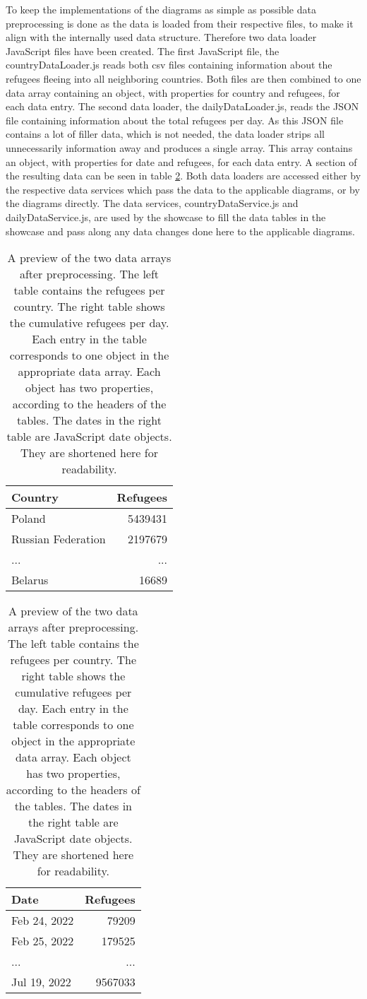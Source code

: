 To keep the implementations of the diagrams as simple as possible data preprocessing is done as the data is loaded from their respective files, to make it align with the internally used data structure. Therefore two data loader JavaScript files have been created. The first JavaScript file, the countryDataLoader.js reads both csv files containing information about the refugees fleeing into all neighboring countries. Both files are then combined to one data array containing an object, with properties for country and refugees, for each data entry. The second data loader, the dailyDataLoader.js, reads the JSON file containing information about the total refugees per day. As this JSON file contains a lot of filler data, which is not needed, the data loader strips all unnecessarily information away and produces a single array. This array contains an object, with properties for date and refugees, for each data entry. A section of the resulting data can be seen in table \ref{tab:data}. Both data loaders are accessed either by the respective data services which pass the data to the applicable diagrams, or by the diagrams directly. The data services, countryDataService.js and dailyDataService.js, are used by the showcase to fill the data tables in the showcase and pass along any data changes done here to the applicable diagrams.

\begin{table}[ht]
    \centering
    \begin{tabular}{l|r}
        Country & Refugees \\
        \hline \hline
        Poland & 5439431 \\
        Russian Federation & 2197679 \\
        ... & ... \\
        Belarus & 16689 \\
    \end{tabular}
    \quad
    \begin{tabular}{l|r}
        Date & Refugees \\
        \hline \hline
        Feb 24, 2022 & 79209 \\
        Feb 25, 2022 & 179525 \\
        ... & ... \\
        Jul 19, 2022 & 9567033 \\
    \end{tabular}
    \captionsetup{width=0.9\textwidth}
    \caption{A preview of the two data arrays after preprocessing. The left table contains the refugees per country. The right table shows the cumulative refugees per day. Each entry in the table corresponds to one object in the appropriate data array. Each object has two properties, according to the headers of the tables. The dates in the right table are JavaScript date objects. They are shortened here for readability.}
    \label{tab:data}
\end{table}


